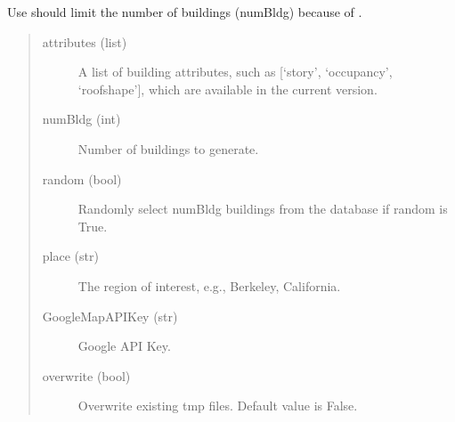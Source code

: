 \documentclass[letterpaper,10pt,english]{sphinxmanual}
\begin{document}
\sphinxAtStartPar
Use should limit the number of buildings (numBldg) because of {\hyperref[\detokenize{common/user_manual/workflow:limitthenumber}]{}}.
\begin{quote}

\begin{sphinxVerbatim}[commandchars=\\\{\}]
   

  \PYG{p}{[}\PYG{p}{]}
                

  
\end{sphinxVerbatim}
\end{quote}
\begin{quote}\begin{description}
\item[{attributes (list)}] \leavevmode
\sphinxAtStartPar
A list of building attributes, such as {[}‘story’, ‘occupancy’, ‘roofshape’{]}, which are available in the current version.

\item[{numBldg (int)}] \leavevmode
\sphinxAtStartPar
Number of buildings to generate.

\item[{random (bool)}] \leavevmode
\sphinxAtStartPar
Randomly select numBldg buildings from the database if random is True.

\item[{place (str)}] \leavevmode
\sphinxAtStartPar
The region of interest, e.g., Berkeley, California.

\item[{GoogleMapAPIKey (str)}] \leavevmode
\sphinxAtStartPar
Google API Key.

\item[{overwrite (bool)}] \leavevmode
\sphinxAtStartPar
Overwrite existing tmp files. Default value is False.

\end{description}\end{quote}
\end{document}
